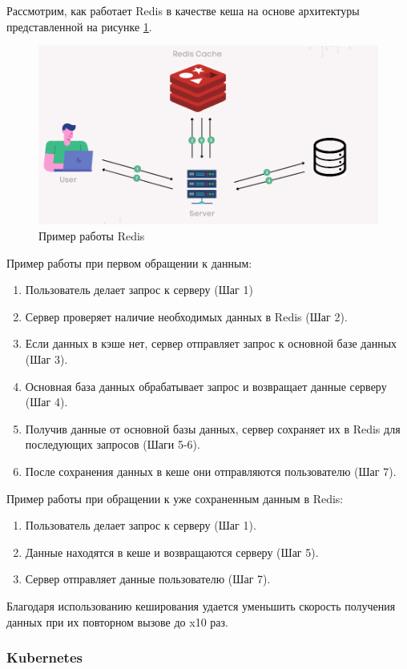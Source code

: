 Рассмотрим, как работает Redis в качестве кеша на основе архитектуры представленной на рисунке \ref{fig:-Redis}.
\begin{figure}
	\centering
	\includegraphics[width=0.9\linewidth]{"images/Redis"}
	\caption{Пример работы Redis}
	\label{fig:-Redis}
\end{figure}

Пример работы при первом обращении к данным:
\begin{enumerate}
	\item Пользователь делает запрос к серверу (Шаг 1)
	\item Сервер проверяет наличие необходимых данных в Redis (Шаг 2).
	\item Если данных в кэше нет, сервер отправляет запрос к основной базе данных (Шаг 3).
	\item Основная база данных обрабатывает запрос и возвращает данные серверу (Шаг 4).
	\item Получив данные от основной базы данных, сервер сохраняет их в Redis для последующих запросов (Шаги 5-6).
	\item После сохранения данных в кеше они отправляются пользователю (Шаг 7).
\end{enumerate}

Пример работы при обращении к уже сохраненным данным в Redis:
\begin{enumerate}
	\item Пользователь делает запрос к серверу (Шаг 1).
	\item Данные находятся в кеше и возвращаются серверу (Шаг 5).
	\item Сервер отправляет данные пользователю (Шаг 7).
\end{enumerate}

Благодаря использованию кеширования удается уменьшить скорость получения данных при их повторном вызове до x10 раз.

\subsubsection{Kubernetes}

